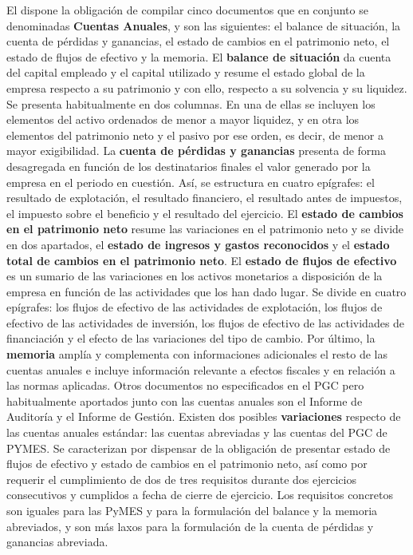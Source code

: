 \documentclass{nuevotema}
\begin{document}
El  dispone la obligación de compilar cinco documentos que en conjunto se denominadas \textbf{Cuentas Anuales}, y son las siguientes: el balance de situación, la cuenta de pérdidas y ganancias, el estado de cambios en el patrimonio neto, el estado de flujos de efectivo y la memoria. El \textbf{balance de situación} da cuenta del capital empleado y el capital utilizado y resume el estado global de la empresa respecto a su patrimonio y con ello, respecto a su solvencia y su liquidez. Se presenta habitualmente en dos columnas. En una de ellas se incluyen los elementos del activo ordenados de menor a mayor liquidez, y en otra los elementos del patrimonio neto y el pasivo por ese orden, es decir, de menor a mayor exigibilidad. La \textbf{cuenta de pérdidas y ganancias} presenta de forma desagregada en función de los destinatarios finales el valor generado por la empresa en el periodo en cuestión. Así, se estructura en cuatro epígrafes: el resultado de explotación, el resultado financiero, el resultado antes de impuestos, el impuesto sobre el beneficio y el resultado del ejercicio. El \textbf{estado de cambios en el patrimonio neto} resume las variaciones en el patrimonio neto y se divide en dos apartados, el \textbf{estado de ingresos y gastos reconocidos} y el \textbf{estado total de cambios en el patrimonio neto}. El \textbf{estado de flujos de efectivo} es un sumario de las variaciones en los activos monetarios a disposición de la empresa en función de las actividades que los han dado lugar. Se divide en cuatro epígrafes: los flujos de efectivo de las actividades de explotación, los flujos de efectivo de las actividades de inversión, los flujos de efectivo de las actividades de financiación y el efecto de las variaciones del tipo de cambio. Por último, la \textbf{memoria} amplía y complementa con informaciones adicionales el resto de las cuentas anuales e incluye información relevante a efectos fiscales y en relación a las normas aplicadas. Otros documentos no especificados en el PGC pero habitualmente aportados junto con las cuentas anuales son el Informe de Auditoría y el Informe de Gestión. Existen dos posibles \textbf{variaciones} respecto de las cuentas anuales estándar: las cuentas abreviadas y las cuentas del PGC de PYMES. Se caracterizan por dispensar de la obligación de presentar estado de flujos de efectivo y estado de cambios en el patrimonio neto, así como por requerir el cumplimiento de dos de tres requisitos durante dos ejercicios consecutivos y cumplidos a fecha de cierre de ejercicio. Los requisitos concretos son iguales para las PyMES y para la formulación del balance y la memoria abreviados, y son más laxos para la formulación de la cuenta de pérdidas y ganancias abreviada.
\end{document}
